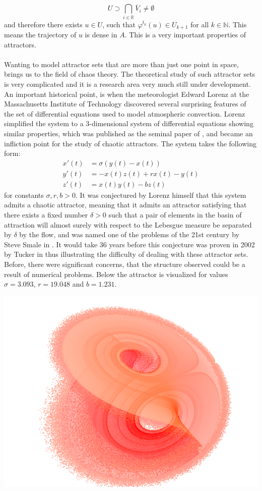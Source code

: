 \documentclass[11pt, a4paper]{memoir}
\theoremstyle{break}
\theoremstyle{break}
\theoremstyle{nonumberplain}
\newcommand{\mN}{\mathbb{N}}
\newcommand{\mR}{\mathbb{R}}
\begin{document}
$$U\supset \bigcap_{i\in \mR} \overline{V}_i\neq \emptyset$$
 and therefore there exists $u\in U$, such that $\varphi^{t_k}(u)\in U_{k+1}$ for all $k\in \mN$. This means the trajectory of $u$ is dense in $A$. This is a very important properties of attractors.\\\\
Wanting to model attractor sets that are more than just one point in space, brings us to the field of chaos theory. The theoretical study of such attractor sets is very complicated and it is a research area very much still under development. An important historical point, is when the meteorologist Edward Lorenz at the Massachusetts Institute of Technology discovered several surprising features of the set of differential equations used to model atmospheric convection. Lorenz simplified the system to a 3-dimensional system of differential equations showing similar properties, which was published as the seminal paper of \cite{Lorenz}, and became an infliction point for the study of chaotic attractors. The system takes the following form:
\begin{align*}
x'(t)&=\sigma(y(t)-x(t))\\
y'(t)&=-x(t)z(t)+rx(t)-y(t)\\
z'(t)&=x(t)y(t)-bz(t)
\end{align*}
for constants $\sigma,r,b>0$. It was conjectured by Lorenz himself that this system admits a chaotic attractor, meaning that it admits an attractor satisfying that there exists a fixed number $\delta >0$ such that a pair of elements in the basin of attraction will almost surely with respect to the Lebesgue measure be separated by $\delta$ by the flow, and was named one of the problems of the 21st century by Steve Smale in \cite{Smale1998}. It would take 36 years before this conjecture was proven in 2002 by Tucker in \cite{Tucker2002} thus illustrating the difficulty of dealing with these attractor sets. Before, there were significant concerns, that the structure observed could be a result of numerical problems. Below the attractor is visualized for values $\sigma=3.093$, $r=19.048$ and $b=1.231$.
\begin{center}
	\includegraphics[scale=0.45]{lorenz.png}
\end{center}
\end{document}
